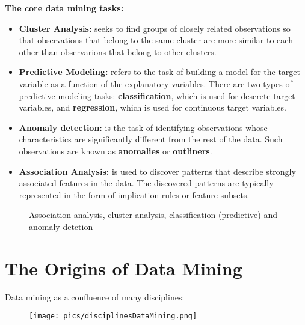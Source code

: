 	{\bf The core data mining tasks:}
	\begin{itemize}
		\item {\bf Cluster Analysis:} seeks to find groups of closely related observations
		so that observations that belong to the same cluster are more similar to each other
		than observarions that belong to other clusters.
		\item {\bf Predictive Modeling:} refers to the task of building a model for the 
		target variable as a function of the explanatory variables. There are two types of 
		predictive modeling tasks: {\bf classification}, which is used for descrete target 
		variables, and {\bf regression}, which is used for continuous target variables. 
		\item {\bf Anomaly detection:} is the task of identifying observations whose 
		characteristics are significantly different from the rest of the data. Such observations
		are known as {\bf anomalies} or {\bf outliners}.
		\item {\bf Association Analysis:} is used to discover patterns that describe strongly
		associated features in the data. The discovered patterns are typically represented in the 
		form of implication rules or feature subsets. 
	\end{itemize}

	\begin{figure}[H]
		\centering
		\caption{Association analysis, cluster analysis, classification (predictive) 
		and anomaly detction}
	\end{figure}

\section{The Origins of Data Mining}

	Data mining as a confluence of many disciplines:

	\begin{figure}[H]
		\texttt{[image: pics/disciplinesDataMining.png]}
	\end{figure}



	

